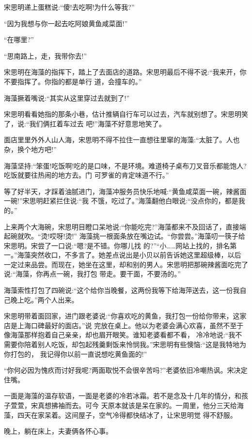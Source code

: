\documentclass[11pt,a4paper,onecolumn]{article}
\begin{document}
宋思明递上蛋糕说:``傻!去吃啊!为什么等我?''

``因为我想与你一起去吃阿娘黄鱼咸菜面!''

``在哪里?''

``思南路上，走，我带你去!''

宋思明在海藻的指挥下，踏上了去面店的道路。宋思明最后不得不说:``我来开，你不要指挥了。你指的都是单行
道，会撞车的。''

海藻撅着嘴说:``其实从这里穿过去就到了!''

宋思明看看她指的那条小巷，估计推辆自行车可以过去，汽车就别想了。宋思明笑了，说:``我们俩扛着车过去
吧!''海藻不好意思地笑了。

面店里里外外人山人海，宋思明不得不拉住一直想往里窜的海藻:``太脏了。人也杂，换个地方吧!''

海藻坚持:``笨蛋!吃饭啊!吃的是口味，不是环境。难道椅子桌布刀叉音乐都能饱人?吃饭就要往热闹的地方去。门
可罗雀的肯定味道不行。''

等了好半天，才踩着油腻进门，海藻冲服务员快乐地喊:``黄鱼咸菜面一碗，辣酱面一碗!''宋思明赶紧拦住说:``我
不饿，吃过了。''海藻翻他白眼说:``没点你的，都是我的。''

上来两个大海碗，宋思明目瞪口呆地说:``你能吃完?''海藻都来不及回话了，直接端起碗就吹。``烫!哎呀!烫!''
海藻挑一根面条放在嘴边试。``你尝尝。''海藻叨一筷子给宋思明。宋尝了一口说:``嗯?是不错。你哪儿找
的?''``小……网站上找的，排名第一。''海藻突然收口，不多言了。她差点说出是小贝以前告诉她这里超级棒，以后
一定过来品尝。而现在，她坐在这里，却和别的男人。宋思明把那碗辣酱面吃完了说:``海藻，你再点一碗，我打包
带走。要干面，不要汤的。''

海藻索性打包了四碗说:``这个给你当晚餐，这两份我等下给海萍送去，这一份我自己晚上吃。''两个人出来。

宋思明带着面回家，进门跟老婆说:``你喜欢吃的黄鱼，我打包一份给你带来，这家店是上海口碑最好的面店。''说
完放在桌上。他以为老婆会满心欢喜，虽然不至于像海藻那样抱着自己亲亲，却也眉开眼笑。谁知老婆看都不看，
冷冷地说:``我不需要你陪着别人吃饭，却包起残羹剩饭来怜悯我。''宋思明有些懊恼:``这是我特地为你打包的，
我记得你以前一直说想吃黄鱼面的!''

``你何必因为愧疚而讨好我呢?两面取悦不会很辛苦吗?''老婆依旧冷嘲热讽。宋决定住嘴。

一面是海藻的温存软语，一面是老婆的冷若冰霜。若不是念及十几年的情分，和孩子萱萱，宋真想拂袖而去。可今
天原本就该是呆在家的。一周里，他分三天给海藻，四天在家呆着。这间屋子，空气冷得都快结冰了，让宋思明觉
得不舒服。

晚上，躺在床上，夫妻俩各怀心事。
\end{document}
